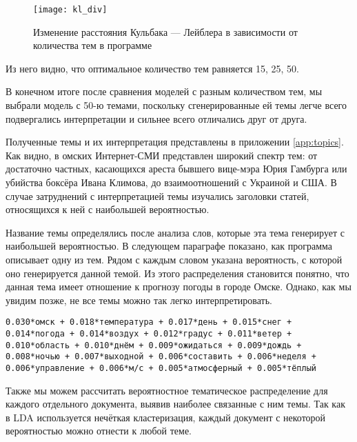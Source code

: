 \begin{figure}
	\centering
    \texttt{[image: kl\_div]}
    \caption{Изменение расстояния Кульбака — Лейблера в зависимости от количества тем в программе}
    \label{fig:kl_div}
\end{figure}

Из него видно, что оптимальное количество тем равняется 15, 25, 50.

В конечном итоге после сравнения моделей с разным количеством тем, мы выбрали модель с 50-ю темами, поскольку сгенерированные ей темы легче всего подвергались интерпретации и сильнее всего отличались друг от друга.

Полученные темы и их интерпретация представлены в приложении \ref{app:topics}. Как видно, в омских Интернет-СМИ представлен широкий спектр тем: от достаточно частных, касающихся ареста бывшего вице-мэра Юрия Гамбурга или убийства боксёра Ивана Климова, до взаимоотношений с Украиной и США. В случае затруднений с интерпретацией темы изучались заголовки статей, относящихся к ней с наибольшей вероятностью.

Название темы определялись после анализа слов, которые эта тема генерирует с наибольшей вероятностью. В следующем параграфе показано, как программа описывает одну из тем. Рядом с каждым словом указана вероятность, с которой оно генерируется данной темой. Из этого распределения становится понятно, что данная тема имеет отношение к прогнозу погоды в городе Омске. Однако, как мы увидим позже, не все темы можно так легко интерпретировать.

\texttt{0.030*омск + 0.018*температура + 0.017*день + 0.015*снег + 0.014*погода + 0.014*воздух + 0.012*градус + 0.011*ветер + 0.010*область + 0.010*днём + 0.009*ожидаться + 0.009*дождь + 0.008*ночью + 0.007*выходной + 0.006*составить + 0.006*неделя + 0.006*управление + 0.006*м/с + 0.005*атмосферный + 0.005*тёплый}

Также мы можем рассчитать вероятностное тематическое распределение для каждого отдельного документа, выявив наиболее связанные с ним темы. Так как в LDA используется нечёткая кластеризация, каждый документ с некоторой вероятностью можно отнести к любой теме. %


